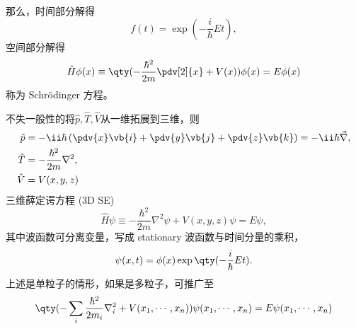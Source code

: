 那么，时间部分解得
\begin{equation}
f (t) = \exp \left( - \frac{i}{\hbar} E t \right),
\end{equation}
空间部分解得
\begin{equation}
\hat H \phi(x) \equiv \qty(- \frac{\hbar^2}{2 m} \pdv[2]{x} + V (x)) \phi(x) = E \phi(x)
\end{equation}
称为 Schr\"odinger 方程。


不失一般性的将$ \hat p, \hat T, \hat V $从一维拓展到三维，则
\begin{align}
\hat p &= -\ii\hbar \left(\pdv{x}\vb{i} + \pdv{y}\vb{j} + \pdv{z}\vb{k}\right) = -\ii\hbar \vec\nabla, \\
\hat T &= -\frac{\hbar^2}{2m}\nabla^2, \\
\hat V &= V(x,y,z)
\end{align}
三维薛定谔方程 (3D SE)
\begin{equation}
\hat H \psi %
\equiv - \frac{\hbar^2}{2 m} \nabla^2 \psi + V (x, y, z) \psi = E \psi,
\end{equation}
其中波函数可分离变量，写成 stationary 波函数与时间分量的乘积，
\begin{equation}
\psi(x,t) = \phi(x) \exp \qty( -\dfrac{i}{\hbar} Et).
\end{equation}
上述是单粒子的情形，如果是多粒子，可推广至
\begin{equation}
\qty( -\sum_i \dfrac{\hbar^2}{2m_i}\nabla_i^2 + V(x_1, \cdots, x_n)) \psi(x_1,\cdots,x_n) = E \psi(x_1,\cdots,x_n)
\end{equation}

